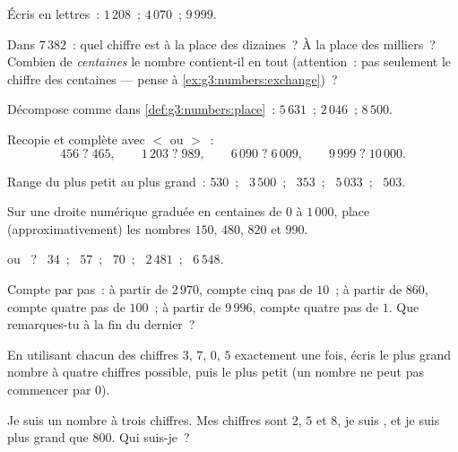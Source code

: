 \begin{exercise}[$\star$]\label{exo:g3:numbers:2}
Écris en lettres~: $1\,208$~; \quad $4\,070$~; \quad $9\,999$.
\end{exercise}

\begin{exercise}[$\star$]\label{exo:g3:numbers:3}
Dans $7\,382$~: quel chiffre est à la place des dizaines~? À la
place des milliers~? Combien de \emph{centaines} le nombre contient-il
en tout (attention~: pas seulement le chiffre des centaines ---
pense à \cref{ex:g3:numbers:exchange})~?
\end{exercise}

\begin{exercise}[$\star$]\label{exo:g3:numbers:4}
Décompose comme dans \cref{def:g3:numbers:place}~:
$5\,631$~; \quad $2\,046$~; \quad $8\,500$.
\end{exercise}

\begin{exercise}[$\star$]\label{exo:g3:numbers:5}
Recopie et complète avec $<$ ou $>$~:
\[
456 \;?\; 465, \qquad
1\,203 \;?\; 989, \qquad
6\,090 \;?\; 6\,009, \qquad
9\,999 \;?\; 10\,000 .
\]
\end{exercise}

\begin{exercise}[$\star$]\label{exo:g3:numbers:6}
Range du plus petit au plus grand~: $530$~; \ $3\,500$~; \ $353$~; \
$5\,033$~; \ $503$.
\end{exercise}

\begin{exercise}[$\star$]\label{exo:g3:numbers:7}
Sur une droite numérique graduée en centaines de $0$ à
$1\,000$, place (approximativement) les nombres $150$, $480$, $820$
et $990$.
\end{exercise}

\begin{exercise}[$\star$]\label{exo:g3:numbers:8}
 ou ~? \ $34$~; \ $57$~; \ $70$~; \ $2\,481$~; \ $6\,548$.
\end{exercise}

\begin{exercise}[$\star$]\label{exo:g3:numbers:9}
Compte par pas~: à partir de $2\,970$, compte cinq pas de $10$~; à
partir de $860$, compte quatre pas de $100$~; à partir de $9\,996$,
compte quatre pas de $1$. Que remarques-tu à la fin du dernier~?
\end{exercise}

\begin{exercise}[$\star\star$]\label{exo:g3:numbers:10}
En utilisant chacun des chiffres $3$, $7$, $0$, $5$ exactement une
fois, écris le plus grand nombre à quatre chiffres possible, puis
le plus petit (un nombre ne peut pas commencer par $0$).
\end{exercise}

\begin{exercise}[$\star\star$]\label{exo:g3:numbers:11}
Je suis un nombre à trois chiffres. Mes chiffres sont $2$, $5$ et
$8$, je suis \omterm{def:g3:numbers:evenodd}{pair}, et je suis plus grand que $800$. Qui suis-je~?
\end{exercise}
